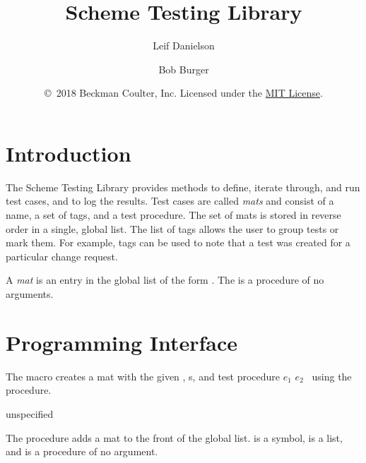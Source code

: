 \documentclass[letterpaper,11pt,twoside,final]{article}
\begin{document}
\title {Scheme Testing Library}
\author {Leif Danielson \and Bob Burger}
\date {\copyright\ 2018 Beckman Coulter, Inc.
  Licensed under the \href{https://opensource.org/licenses/MIT}{MIT License}.}
\maketitle

\section* {Introduction}

The Scheme Testing Library  provides methods to
define, iterate through, and run test cases, and to log the
results. Test cases are called \emph{mats} and consist of a name, a
set of tags, and a test procedure.  The set of mats is stored in
reverse order in a single, global list.  The list of tags allows the
user to group tests or mark them.  For example, tags can be used to
note that a test was created for a particular change request.

A \emph{mat} is an entry in the global list of the form
. The  is a
procedure of no arguments.

\section* {Programming Interface}

\begin{syntax}
\end{syntax}
\expandsto{} 

The  macro creates a mat with the given ,
s, and test procedure $e_1$ $e_2$ \etc\ using the
 procedure.

\begin{procedure}
\end{procedure}
\returns{} unspecified

The  procedure adds a mat to the front of the global
list.  is a symbol,  is a list, and  is
a procedure of no argument.
\end{document}
